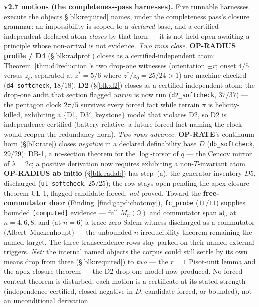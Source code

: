 \documentclass[11pt]{article}
\newcommand{\Q}{\mathbb{Q}}
\theoremstyle{plain}
\theoremstyle{definition}
\theoremstyle{remark}
\begin{document}
\smallskip\noindent
\textbf{v2.7 motions (the completeness-pass harnesses).} Five runnable harnesses
execute the objects \S\ref{blk:required} names, under the completeness pass's
closure grammar: an impossibility is scoped to a \emph{declared} base, and a
certified-independent declared atom \emph{closes} by that horn --- it is not held
open awaiting a principle whose non-arrival is not evidence. \emph{Two rows close.}
\textbf{OP-RADIUS profile / D4} (\S\ref{blk:radprof}) closes as a
certified-independent atom: Theorem~\ref{thm:d4reduction}'s two drop-one witnesses
(orientation $\pm r$; onset $4/5$ versus $z_c$, separated at $z^\ast=5/6$ where
$z^\ast/z_0=25/24>1$) are machine-checked (\texttt{d4\_softcheck}, $18/18$).
\textbf{D2} (\S\ref{blk:d2}) closes as a certified-independent atom: the drop-one
audit that section flagged \emph{unrun} is now run (\texttt{d2\_softcheck}, $37/37$)
--- the pentagon clock $2\pi/5$ survives every forced fact while terrain $\pi$ is
helicity-killed, exhibiting a $\{$D1, D3$'$, keystone$\}$ model that violates D2, so
D2 is independence-certified (battery-relative: a future forced fact naming the
clock would reopen the redundancy horn). \emph{Two rows advance.} \textbf{OP-RATE}'s
continuum horn (\S\ref{blk:rate}) closes \emph{negative} in a declared definability
base $D$ (\texttt{db\_softcheck}, $29/29$): \textsc{DB-1}, a no-section theorem for
the $\log$-torsor of $q$ --- the Cencov mirror of $\lambda=2c$; a positive
derivation now requires exhibiting a non-$T$-invariant atom.
\textbf{OP-RADIUS ab initio} (\S\ref{blk:radab}) has step~(a), the generator
inventory $D5$, discharged (\texttt{ul\_softcheck}, $25/25$); the row stays open
pending the apex-closure theorem \textsc{UL-1}, flagged candidate-forced,
\emph{not} proved. Toward the \textbf{free-commutator door}
(Finding~\ref{find:gapdichotomy}), \texttt{fc\_probe} ($11/11$) supplies bounded
\texttt{[computed]} evidence --- full $M_n(\Q)$ and commutator span $\mathfrak{sl}_n$
at $n=4,6,8$, and (at $n=6$) a trace-zero Salem witness discharged as a commutator
(Albert--Muckenhoupt) --- the unbounded-$n$ irreducibility theorem remaining the
named target.
The three transcendence rows stay parked on their named external triggers.
\emph{Net:} the internal named objects the corpus could still settle by its own
means drop from three (\S\ref{blk:required}) to \emph{two} --- the $r=1$ Pisot-unit
lemma and the apex-closure theorem --- the D2 drop-one model now produced. No
forced-content theorem is disturbed; each motion is a certificate at its stated
strength (independence-certified, closed-negative-in-$D$, candidate-forced, or
bounded), not an unconditional derivation.
\end{document}
